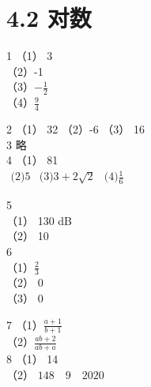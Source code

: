 \documentclass[10pt]{article}
\begin{document}
\section*{4.2 对数}
1 （1） 3\\
（2）-1\\
（3）\(-\frac{1}{2}\)\\
（4）\(\frac{9}{4}\)

2 （1） 32 （2）-6 （3） 16\\
3 略\\
4 （1） 81\\
\(\begin{array}{lll}\text {(2)} 5 & \text {(3)} 3+2 \sqrt{2} & \text {(4)} \frac{1}{6}\end{array}\)

5\\
（1） 130 dB\\
（2） 10\\
6\\
（1）\(\frac{2}{3}\)\\
（2） 0\\
（3） 0

7 （1）\(\frac{a+1}{b+1}\)\\
（2）\(\frac{a b+2}{a b+a}\)\\
8 （1） 14\\
（2） \(148 \quad 9 \quad 2020\)
\end{document}
